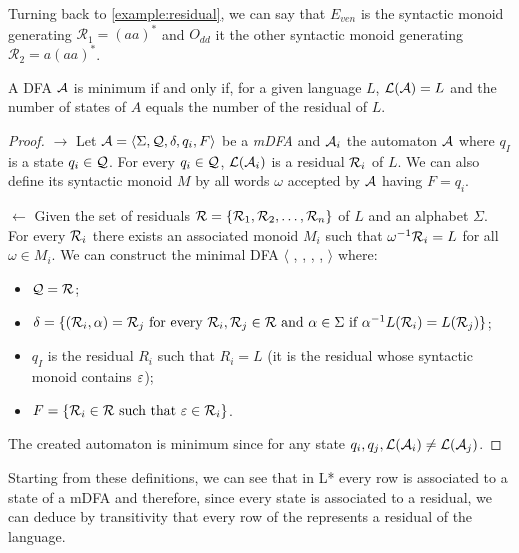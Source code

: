 \begin{example}
  Turning back to \cref{example:residual}, we can say that $E_{ven}$ is the syntactic monoid generating $\mathcal{R_1} = (aa)^*$ and $O_{dd}$ it the other syntactic monoid generating $\mathcal{R_2} = a(aa)^*$.
\end{example}

\begin{theorem}
  A DFA $\mathcal{A}$ is minimum if and only if, for a given language $L$, $\mathcal{L}(\mathcal{A}) = L$ and the number of states of $A$ equals the number of the residual of $L$.
\end{theorem}

\begin{proof}
  $\rightarrow$ Let $\mathcal{A} = \langle \Sigma, \mathcal{Q}, \delta, q_i, F \rangle $ be a \textit{mDFA} and $\mathcal{A}_i$ the automaton $\mathcal{A}$ where $q_I$ is a state $q_i \in \mathcal{Q}$. For every $q_i \in \mathcal{Q}$, $\mathcal{L}(\mathcal{A}_i)$ is a residual $\mathcal{R}_i$ of $L$. We can also define its syntactic monoid $M$ by all words $\omega$ accepted by $\mathcal{A}$ having $F = {q_i}$.

  $\leftarrow$ Given the set of residuals $\mathcal{R} = \{\mathcal{R}_1, \mathcal{R}_2, \dots, \mathcal{R}_n\}$ of $L$ and an alphabet $\Sigma$. For every $\mathcal{R}_i$ there exists an associated monoid $M_i$ such that $\omega^{-1}\mathcal{R}_i = L$ for all $\omega \in M_i$. We can construct the minimal DFA $\langle$ \alphabet{}, \states{}, \transition{}, \qzero{}, \qend{} $\rangle$ where:
  \begin{itemize}
    \item $\mathcal{Q} = \mathcal{R}$;
    \item $\delta = \{(\mathcal{R}_i, \alpha) = \mathcal{R}_j \text{ for every } \mathcal{R}_i, \mathcal{R}_j \in \mathcal{R} \text{ and } \alpha \in \Sigma \text{ if } \alpha^{-1}L(\mathcal{R}_i) = L(\mathcal{R}_j)\}$;
    \item $q_I$ is the residual $R_i$ such that $R_i = L$ (it is the residual whose syntactic monoid contains $\varepsilon$);
    \item $F = \{\mathcal{R}_i \in \mathcal{R} \text{ such that } \varepsilon \in \mathcal{R}_i\}$.
  \end{itemize}
  The created automaton is minimum since for any state $q_i, q_j, \mathcal{L}(\mathcal{A}_i) \neq \mathcal{L}(\mathcal{A}_j)$.
\end{proof}

Starting from these definitions, we can see that in L* every row is associated to a state of a mDFA and therefore, since every state is associated to a residual, we can deduce by transitivity that every row of the \OT represents a residual of the language.

